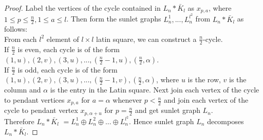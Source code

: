 \documentclass[12pt]{report}
\begin{document}
\begin{proof}
Label the vertices of the cycle contained in $L_n*\bar{K}_{l}$ as $x_{p,a}$, where $1\leq p\leq \frac{n}{2},1\leq a\leq l$. Then form the sunlet graphs $L_n^{1},...,L_n^{l^{2}}$ from $L_n*\bar{K%
}_{l}$ as follows:\\
From each $l^2$ element of $l\times l$ latin square, we can construct a $\frac{n}{2}$-cycle.\\
If $\frac{n}{2}$ is even, each cycle is of the form $(1,u),(2,v),(3,u),...,(\frac{n}{2}-1,u),(\frac{n}{2},\alpha)$.\\
If $\frac{n}{2}$ is odd, each cycle is of the form
$(1,u),(2,v),(3,u),...,(\frac{n}{2}-1,v),(\frac{n}{2},\alpha)$,
where $u$ is the row, $v$ is the column and $\alpha $ is the entry
in the Latin square. Next join each
vertex of the cycle to pendant vertices $x_{p,a}$ for $a=\alpha $ whenever $p<\frac{n}{2}$ and join each vertex of the cycle to pendant vertex $x_{p,\alpha +u}$ for $p=\frac{n}{2}$ and get sunlet graph $L_n$. \\ Therefore $L_n*\bar{K}_{l}$ $%
=L_n^{1}\oplus L_n^{2}\oplus ...\oplus L_n^{l^{2}}$. Hence sunlet
graph $L_n$ decomposes $L_n*\bar{K}_l$.
\end{proof}
\end{document}
